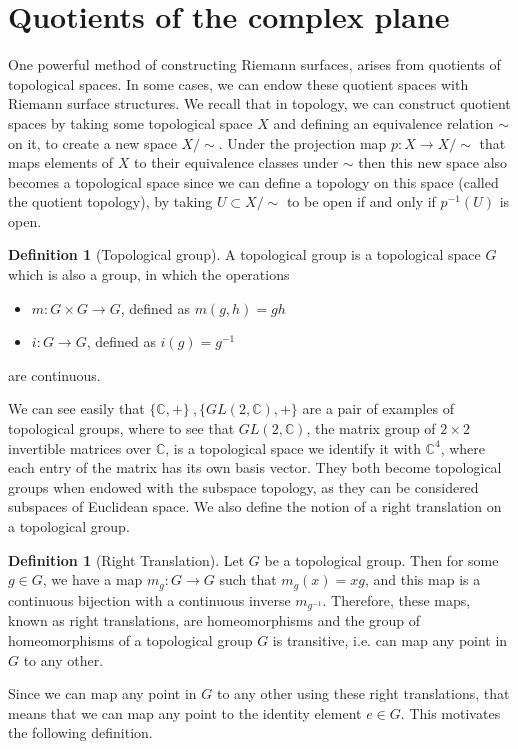 \documentclass[11pt]{report}
\theoremstyle{definition}
\newtheorem{defn}[thm]{Definition}
\begin{document}
\section{Quotients of the complex plane}\label{QuotientSection}
One powerful method of constructing Riemann surfaces, arises from quotients of topological spaces. In some cases, we can endow these quotient spaces with Riemann surface structures. We recall that in topology, we can construct quotient spaces by taking some topological space $X$ and defining an equivalence relation $\sim$ on it, to create a new space $X/\sim$. Under the projection map $p \colon X \rightarrow X/\sim$ that maps elements of $X$ to their equivalence classes under $\sim$ then this new space also becomes a topological space since we can define a topology on this space (called the quotient topology), by taking $U \subset X/\sim$ to be open if and only if $p^{-1}(U)$ is open.
\begin{defn}[Topological group]
  A topological group is a topological space $G$ which is also a group, in which the operations
  \begin{itemize}
    \item $m:G \times G \rightarrow G$, defined as $m(g,h)=gh$
    \item $i:G \rightarrow G$, defined as $i(g)=g^{-1}$
  \end{itemize}
  are continuous.
\end{defn}
We can see easily that $\{\mathbb{C}, + \} \ ,\{GL(2,\mathbb{C}), +\}$ are a pair of examples of topological groups, where to see that $GL(2,\mathbb{C})$, the matrix group of $2\times 2$ invertible matrices over $\mathbb{C}$, is a topological space we identify it with $\mathbb{C}^4$, where each entry of the matrix has its own basis vector. They both become topological groups when endowed with the subspace topology, as they can be considered subspaces of Euclidean space. We also define the notion of a right translation on a topological group.
\begin{defn}[Right Translation]
  Let $G$ be a topological group. Then for some $g \in G$, we have a map $m_g:G \rightarrow G$ such that $m_g(x) = xg$, and this map is a continuous bijection with a continuous inverse $m_{g^{-1}}$. Therefore, these maps, known as right translations, are homeomorphisms and the group of homeomorphisms of a topological group $G$ is transitive, i.e. can map any point in $G$ to any other.
\end{defn}
Since we can map any point in $G$ to any other using these right translations, that means that we can map any point to the identity element $e \in G$. This motivates the following definition.
\end{document}
